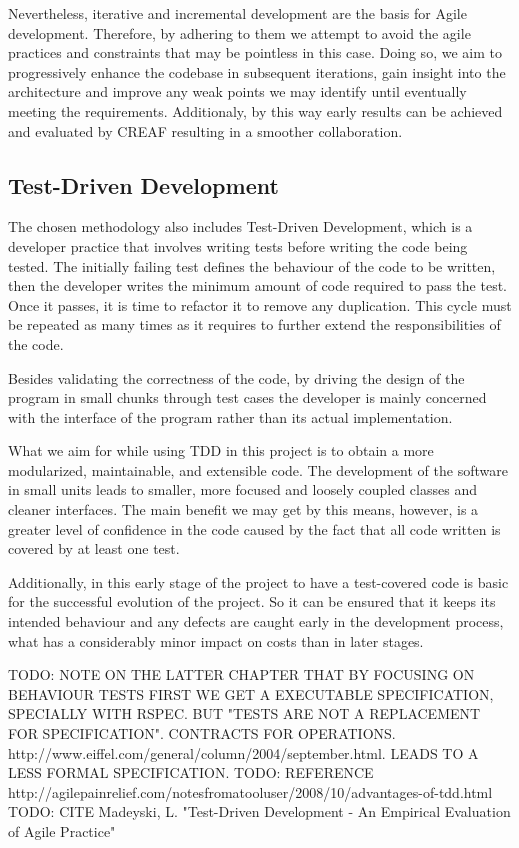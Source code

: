 Nevertheless, iterative and incremental development are the basis for Agile development. Therefore, by adhering to them we attempt to avoid the agile practices and constraints that may be pointless in this case. Doing so, we aim to progressively enhance the codebase in subsequent iterations, gain insight into the architecture and improve any weak points we may identify until eventually meeting the requirements. Additionaly, by this way early results can be achieved and evaluated by CREAF resulting in a smoother collaboration.

\subsection{Test-Driven Development}

The chosen methodology also includes Test-Driven Development, which is a developer practice that involves writing tests before writing the code being tested. The initially failing test defines the behaviour of the code to be written, then the developer writes the minimum amount of code required to pass the test. Once it passes, it is time to refactor it to remove any duplication. This cycle must be repeated as many times as it requires to further extend the responsibilities of the code.

Besides validating the correctness of the code, by driving the design of the program in small chunks through test cases the developer is mainly concerned with the interface of the program rather than its actual implementation.

What we aim for while using TDD in this project is to obtain a more modularized, maintainable, and extensible code. The development of the software in small units leads to smaller, more focused and loosely coupled classes and cleaner interfaces. The main benefit we may get by this means, however, is a greater level of confidence in the code caused by the fact that all code written is covered by at least one test.

Additionally, in this early stage of the project to have a test-covered code is basic for the successful evolution of the project. So it can be ensured that it keeps its intended behaviour and any defects are caught early in the development process, what has a considerably minor impact on costs than in later stages.

TODO: NOTE ON THE LATTER CHAPTER THAT BY FOCUSING ON BEHAVIOUR TESTS FIRST WE GET A EXECUTABLE SPECIFICATION, SPECIALLY WITH RSPEC. BUT "TESTS ARE NOT A REPLACEMENT FOR SPECIFICATION". CONTRACTS FOR OPERATIONS. http://www.eiffel.com/general/column/2004/september.html. LEADS TO A LESS FORMAL SPECIFICATION.
TODO: REFERENCE http://agilepainrelief.com/notesfromatooluser/2008/10/advantages-of-tdd.html
TODO: CITE Madeyski, L. "Test-Driven Development - An Empirical Evaluation of Agile Practice"
